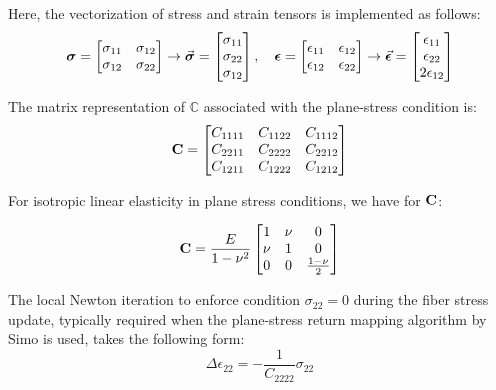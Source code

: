 \begin{appendices}
Here, the vectorization of stress and strain tensors is implemented as follows:
\begin{equation*}
	\bm{\sigma}=\begin{bmatrix}
		\sigma_{11} & \sigma_{12}\\
		\sigma_{12} & \sigma_{22}
	\end{bmatrix}\rightarrow \vec{\bm{\sigma}}=\begin{bmatrix}
	\sigma_{11}\\ \sigma_{22} \\ \sigma_{12}
\end{bmatrix},\quad 
	\bm{\epsilon}=\begin{bmatrix}
	\epsilon_{11} & \epsilon_{12}\\
	\epsilon_{12} & \epsilon_{22}
\end{bmatrix}\rightarrow \vec{\bm{\epsilon}}=\begin{bmatrix}
	\epsilon_{11}\\ \epsilon_{22} \\ 2\epsilon_{12}
\end{bmatrix}
\end{equation*}

The matrix representation of $\mathbb{C}$ associated with the plane-stress 
condition is:
\begin{equation*}
	\mathbf{C}=\begin{bmatrix}
		C_{1111} & C_{1122} & C_{1112}\\
		C_{2211} & C_{2222} & C_{2212}\\
		C_{1211} & C_{1222} & C_{1212}
	\end{bmatrix}
\end{equation*}

For isotropic linear elasticity in plane stress conditions, we have for 
$\mathbf{C}$:

\begin{equation}
	\mathbf{C} = \frac{E}{1-\nu^2}\begin{bmatrix}
		1 & \nu & 0\\
		\nu & 1 & 0\\
		0 & 0 & \frac{1-\nu}{2}
	\end{bmatrix}
\end{equation}

The local Newton iteration to enforce condition $\sigma_{22}=0$ during the 
fiber stress update, typically required when the plane-stress return mapping 
algorithm by Simo\cite{Simo1} is used, takes the following form:
\begin{equation*}
	\Delta\epsilon_{22} = -\frac{1}{C_{2222}}\sigma_{22}
\end{equation*}



\end{appendices}
